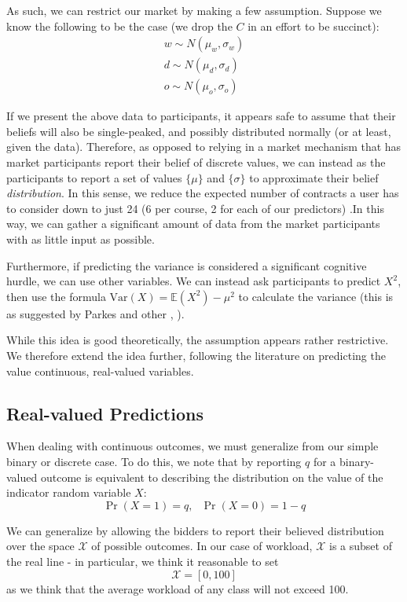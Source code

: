 As such, we can restrict our market by making a few assumption. Suppose we know the following to be the case (we drop the $C$ in an effort to be succinct):
\begin{align}
w \sim N(\mu_w,\sigma_w) \\
d \sim N(\mu_d,\sigma_d) \\
o \sim N(\mu_o,\sigma_o)
\end{align}

If we present the above data to participants, it appears safe to assume that their beliefs will also be single-peaked, and possibly distributed normally (or at least, given the data). Therefore, as opposed to relying in a market mechanism that has market participants report their belief of discrete values, we can instead as the participants to report a set of values $\{ \mu \}$ and $\{\sigma\}$ to approximate their belief \textit{distribution}. In this sense, we reduce the expected number of contracts a user has to consider down to just 24 (6 per course, 2 for each of our predictors) .In this way, we can gather a significant amount of data from the market participants with as little input as possible. 

Furthermore, if predicting the variance is considered a significant cognitive hurdle, we can use other variables. We can instead ask participants to predict $X^2$, then use the formula $\text{Var}(X) = \mathbb{E}(X^2) - \mu^2$ to calculate the variance (this is as suggested by Parkes and other \cite{textbook}, \cite{dudik}).

While this idea is good theoretically, the assumption appears rather restrictive. We therefore extend the idea further, following the literature on predicting the value continuous, real-valued variables.

\subsection{Real-valued Predictions}
When dealing with continuous outcomes, we must generalize from our simple binary or discrete case. 
To do this, we note that by reporting $q$ for a binary-valued outcome is equivalent to describing the distribution on the value of the indicator random variable $X$:
\[\Pr(X=1)= q,\,\,\,\, \Pr(X=0)= 1-q\]

We can generalize by allowing the bidders to report their believed distribution over the space $\mathcal{X}$ of possible outcomes. In our case of workload, $\mathcal{X}$ is a subset of the real line - in particular, we think it reasonable to set
\[\mathcal{X} = [0,100]\] 
as we think that the average workload of any class will not exceed 100.


